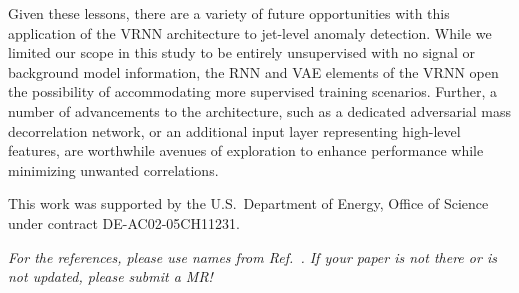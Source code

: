 \documentclass[letterpaper,11pt]{article}
\begin{document}
Given these lessons, there are a variety of future opportunities with this application of the VRNN architecture to jet-level anomaly detection. 
While we limited our scope in this study to be entirely unsupervised with no signal or background model information, the RNN and VAE elements of the VRNN open the possibility of accommodating more supervised training scenarios. 
Further, a number of advancements to the architecture, such as a dedicated adversarial mass decorrelation network, or an additional input layer representing high-level features, are worthwhile avenues of exploration to enhance performance while minimizing unwanted correlations. 




\acknowledgments

This work was supported by the U.S.~Department of Energy, Office of Science under contract DE-AC02-05CH11231. 

\vspace{10mm}

\noindent \textit{For the references, please use names from Ref.~\cite{hepmllivingreview}.  If your paper is not there or is not updated, please submit a MR!}



\end{document}
